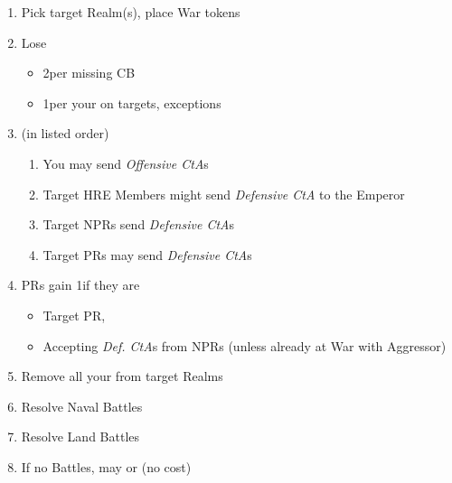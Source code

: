 \documentclass[10pt]{article}
\begin{document}
\addbackground
\addfooter

\begin{enumerate}
	\item Pick target Realm(s), place War tokens
	\item Lose \stability
	\begin{itemize}
		\item {}2\stability per missing CB
		\item 1\stability per your \marriage on targets, exceptions
	\end{itemize}
	\item {} (in listed order)
	\begin{enumerate}[label=\alph*.]
		\item You may send \emph{Offensive CtA}s
		\item {}Target HRE Members might send \emph{Defensive CtA} to the Emperor
		\item Target NPRs send \emph{Defensive CtA}s
		\item Target PRs may send \emph{Defensive CtA}s
	\end{enumerate}
	\item PRs gain 1\milpower if they are
	\begin{itemize}
		\item Target PR, 
		\item Accepting \emph{Def. CtA}s from NPRs (unless already at War with Aggressor)
	\end{itemize}
	\item Remove all your \influence from target Realms
	\item Resolve Naval Battles
	\item Resolve Land Battles
	\item If no Battles, may  or  (no \milpower cost)
\end{enumerate}
\end{document}

